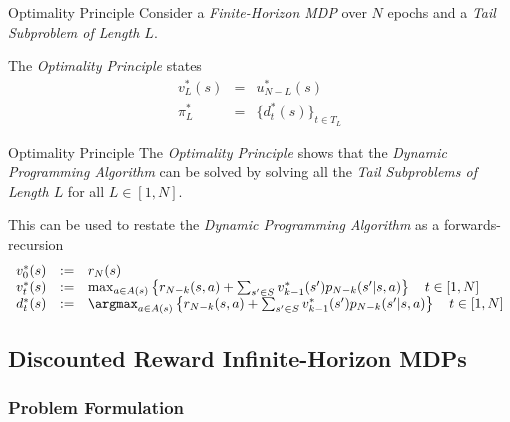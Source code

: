 \documentclass[11pt,a4paper]{article}
\begin{document}
  \begin{theorem}{Optimality Principle}
    Consider a \textit{Finite-Horizon MDP} over $N$ epochs and a \textit{Tail Subproblem of Length $L$}.
    \par The \textit{Optimality Principle} states
    \[\begin{array}{rcl}
      v_L^*(s)&=&u_{N-L}^*(s)\\
      \pi_L^*&=&\{d_t^*(s)\}_{t\in T_L}
    \end{array}\]
  \end{theorem}

  \begin{remark}{Optimality Principle}
    The \textit{Optimality Principle} shows that the \textit{Dynamic Programming Algorithm} can be solved by solving all the \textit{Tail Subproblems of Length $L$} for all $L\in[1,N]$.
    \par This can be used to restate the \textit{Dynamic Programming Algorithm} as a forwards-recursion
    \[\begin{array}{rcl}
      v_0^*(s)&:=&r_N(s)\\
      v_t^*(s)&:=&\max_{a\in A(s)}\left\{r_{N-k}(s,a)+\sum_{s'\in S}v_{k-1}^*(s')p_{N-k}(s'|s,a)\right\}\quad t\in[1,N]\\
      d_t^*(s)&:=&\argmax_{a\in A(s)}\left\{r_{N-k}(s,a)+\sum_{s'\in S}v_{k-1}^*(s')p_{N-k}(s'|s,a)\right\}\quad t\in[1,N]\\
    \end{array}\]
  \end{remark}

\subsection{Discounted Reward Infinite-Horizon MDPs}

\subsubsection{Problem Formulation}
\end{document}
